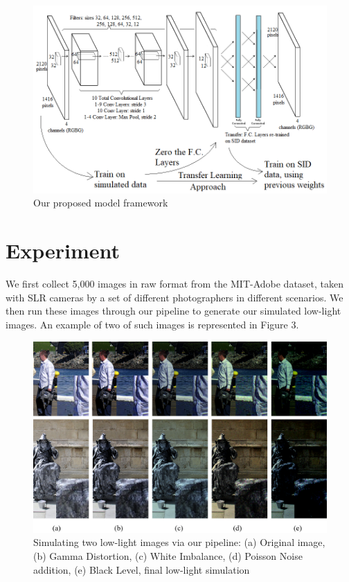 \documentclass{article}
\begin{document}
\begin{figure}[ht]
  \centering
  \includegraphics[scale=0.3]{model.png}
  \caption{Our proposed model framework}
\end{figure}



\section{Experiment}

We first collect 5,000 images in raw format from the MIT-Adobe dataset, taken with SLR cameras by a set of different photographers in different scenarios. We then run these images through our pipeline to generate our simulated low-light images. An example of two of such images is represented in Figure 3. 

\begin{figure}[ht]
  \centering
  \includegraphics[scale=0.3]{fig3.png}
  \caption{Simulating two low-light images via our pipeline: (a) Original
    image, (b) Gamma Distortion, (c) White Imbalance, (d) Poisson Noise addition, (e) Black Level, final low-light simulation}
\end{figure}
\end{document}
